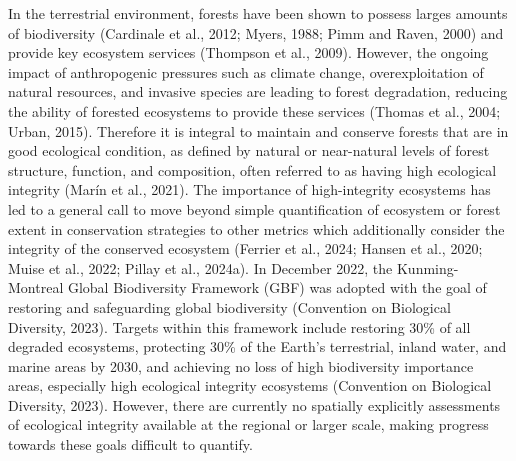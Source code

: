 \documentclass[
]{agujournal2019}
\begin{document}
In the terrestrial environment, forests have been shown to possess
larges amounts of biodiversity (Cardinale et al., 2012; Myers, 1988;
Pimm and Raven, 2000) and provide key ecosystem services (Thompson et
al., 2009). However, the ongoing impact of anthropogenic pressures such
as climate change, overexploitation of natural resources, and invasive
species are leading to forest degradation, reducing the ability of
forested ecosystems to provide these services (Thomas et al., 2004;
Urban, 2015). Therefore it is integral to maintain and conserve forests
that are in good ecological condition, as defined by natural or
near-natural levels of forest structure, function, and composition,
often referred to as having high ecological integrity (Marín et al.,
2021). The importance of high-integrity ecosystems has led to a general
call to move beyond simple quantification of ecosystem or forest extent
in conservation strategies to other metrics which additionally consider
the integrity of the conserved ecosystem (Ferrier et al., 2024; Hansen
et al., 2020; Muise et al., 2022; Pillay et al., 2024a). In December
2022, the Kunming-Montreal Global Biodiversity Framework (GBF) was
adopted with the goal of restoring and safeguarding global biodiversity
(Convention on Biological Diversity, 2023). Targets within this
framework include restoring 30\% of all degraded ecosystems, protecting
30\% of the Earth's terrestrial, inland water, and marine areas by 2030,
and achieving no loss of high biodiversity importance areas, especially
high ecological integrity ecosystems (Convention on Biological
Diversity, 2023). However, there are currently no spatially explicitly
assessments of ecological integrity available at the regional or larger
scale, making progress towards these goals difficult to quantify.
\end{document}
